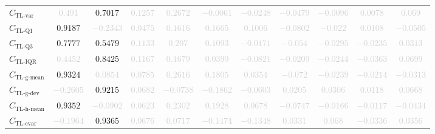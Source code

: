 \documentclass{standalone}
\newcommand{\tlvarname}{\text{TL-var}}
\newcommand{\tlvar}{C_{\tlvarname}}
\newcommand{\tlqonename}{\text{TL-Q1}}
\newcommand{\tlqone}{C_{\tlqonename}}
\newcommand{\tlqthreename}{\text{TL-Q3}}
\newcommand{\tlqthree}{C_{\tlqthreename}}
\newcommand{\tliqrname}{\text{TL-IQR}}
\newcommand{\tliqr}{C_{\tliqrname}}
\newcommand{\tlgmeanname}{\text{TL-g-mean}}
\newcommand{\tlgmean}{C_{\tlgmeanname}}
\newcommand{\tlgdevname}{\text{TL-g-dev}}
\newcommand{\tlgdev}{C_{\tlgdevname}}
\newcommand{\tlhmeanname}{\text{TL-h-mean}}
\newcommand{\tlhmean}{C_{\tlhmeanname}}
\newcommand{\tlcvariationname}{\text{TL-cvar}}
\newcommand{\tlcvariation}{C_{\tlcvariationname}}
\begin{document}
\begin{tabular}{lcccccccccc}
$\tlvar$ & \textcolor{lightgray}{$0.491$} & $0.7017$ & \textcolor{lightgray}{$0.1257$} & \textcolor{lightgray}{$0.2672$} & \textcolor{lightgray}{$-0.0061$} & \textcolor{lightgray}{$-0.0248$} & \textcolor{lightgray}{$-0.0479$} & \textcolor{lightgray}{$-0.0096$} & \textcolor{lightgray}{$0.0078$} & \textcolor{lightgray}{$0.069$} \\ 
$\tlqone$ & $0.9187$ & \textcolor{lightgray}{$-0.2343$} & \textcolor{lightgray}{$0.0475$} & \textcolor{lightgray}{$0.1616$} & \textcolor{lightgray}{$0.1665$} & \textcolor{lightgray}{$0.1006$} & \textcolor{lightgray}{$-0.0802$} & \textcolor{lightgray}{$-0.022$} & \textcolor{lightgray}{$0.0108$} & \textcolor{lightgray}{$-0.0505$} \\ 
$\tlqthree$ & $0.7777$ & $0.5479$ & \textcolor{lightgray}{$0.1133$} & \textcolor{lightgray}{$0.207$} & \textcolor{lightgray}{$0.1093$} & \textcolor{lightgray}{$-0.0171$} & \textcolor{lightgray}{$-0.054$} & \textcolor{lightgray}{$-0.0295$} & \textcolor{lightgray}{$-0.0235$} & \textcolor{lightgray}{$0.0313$} \\ 
$\tliqr$ & \textcolor{lightgray}{$0.4452$} & $0.8425$ & \textcolor{lightgray}{$0.1167$} & \textcolor{lightgray}{$0.1679$} & \textcolor{lightgray}{$0.0399$} & \textcolor{lightgray}{$-0.0821$} & \textcolor{lightgray}{$-0.0209$} & \textcolor{lightgray}{$-0.0244$} & \textcolor{lightgray}{$-0.0363$} & \textcolor{lightgray}{$0.0699$} \\ 
$\tlgmean$ & $0.9324$ & \textcolor{lightgray}{$0.0854$} & \textcolor{lightgray}{$0.0785$} & \textcolor{lightgray}{$0.2616$} & \textcolor{lightgray}{$0.1805$} & \textcolor{lightgray}{$0.0354$} & \textcolor{lightgray}{$-0.072$} & \textcolor{lightgray}{$-0.0239$} & \textcolor{lightgray}{$-0.0214$} & \textcolor{lightgray}{$-0.0313$} \\ 
$\tlgdev$ & \textcolor{lightgray}{$-0.2605$} & $0.9215$ & \textcolor{lightgray}{$0.0682$} & \textcolor{lightgray}{$-0.0738$} & \textcolor{lightgray}{$-0.1862$} & \textcolor{lightgray}{$-0.0603$} & \textcolor{lightgray}{$0.0205$} & \textcolor{lightgray}{$0.0306$} & \textcolor{lightgray}{$0.0118$} & \textcolor{lightgray}{$0.0668$} \\ 
$\tlhmean$ & $0.9352$ & \textcolor{lightgray}{$-0.0902$} & \textcolor{lightgray}{$0.0623$} & \textcolor{lightgray}{$0.2302$} & \textcolor{lightgray}{$0.1928$} & \textcolor{lightgray}{$0.0678$} & \textcolor{lightgray}{$-0.0747$} & \textcolor{lightgray}{$-0.0166$} & \textcolor{lightgray}{$-0.0117$} & \textcolor{lightgray}{$-0.0434$} \\ 
$\tlcvariation$ & \textcolor{lightgray}{$-0.1964$} & $0.9365$ & \textcolor{lightgray}{$0.0676$} & \textcolor{lightgray}{$0.0717$} & \textcolor{lightgray}{$-0.1474$} & \textcolor{lightgray}{$-0.1348$} & \textcolor{lightgray}{$0.0331$} & \textcolor{lightgray}{$0.068$} & \textcolor{lightgray}{$-0.0336$} & \textcolor{lightgray}{$0.0356$} \\ 

\end{tabular}
\end{document}

